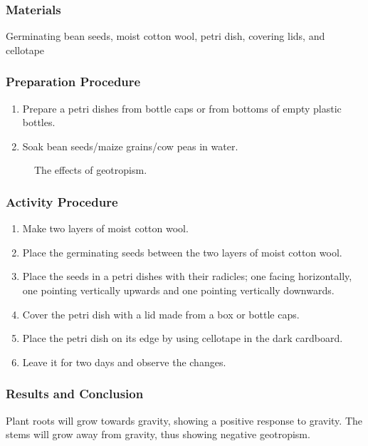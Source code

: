 \subsubsection*{Materials}
Germinating bean seeds, moist cotton wool, petri dish, covering lids, and cellotape

\subsubsection*{Preparation Procedure}
\begin{enumerate}
\item{Prepare a petri dishes from bottle caps or from bottoms of empty plastic bottles.}
\item{Soak bean seeds/maize grains/cow peas in water.}
\end{enumerate}

\begin{figure}[h]
\begin{center}
\def\svgwidth{8.5cm}

\caption{The effects of geotropism.}
\label{fig:fish}
\end{center}
\end{figure}

\subsubsection*{Activity Procedure}
\begin{enumerate}
\item{Make two layers of moist cotton wool.}
\item{Place the germinating seeds between the two layers of moist cotton wool.}
\item{Place the seeds in a petri dishes with their radicles; one facing horizontally, one pointing vertically upwards and one pointing vertically downwards.}
\item{Cover the petri dish with a lid made from a box or bottle caps.}
\item{Place the petri dish on its edge by using cellotape in the dark cardboard.}
\item{Leave it for two days and observe the changes.}
\end{enumerate}

\subsubsection*{Results and Conclusion}
Plant roots will grow towards gravity, showing a positive response to gravity. The stems will grow away from gravity, thus showing negative geotropism.

